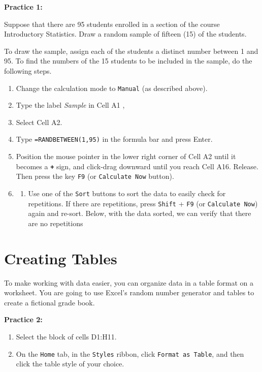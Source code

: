 \documentclass[
]{book}
\providecommand{\tightlist}{%
  \setlength{\itemsep}{0pt}\setlength{\parskip}{0pt}}
\begin{document}
\textbf{Practice 1:}

Suppose that there are 95 students enrolled in a section of the course Introductory Statistics. Draw a random sample of fifteen (15) of the students.

To draw the sample, assign each of the students a distinct number between 1 and 95. To find the numbers of the 15 students to be included in the sample, do the following steps.

\begin{enumerate}
\def\labelenumi{\arabic{enumi}.}
\item
  Change the calculation mode to \texttt{Manual} (as described above).
\item
  Type the label \emph{Sample} in Cell A1 ,
\item
  Select Cell A2.
\item
  Type \texttt{=RANDBETWEEN(1,95)} in the formula bar and press Enter.
\item
  Position the mouse pointer in the lower right corner of Cell A2 until it becomes a \textbf{\texttt{+}} sign, and click-drag downward until you reach Cell A16. Release. Then press the key \texttt{F9} (or \texttt{Calculate\ Now} button).
\item
  \begin{enumerate}
  \def\labelenumii{\arabic{enumii})}
  \setcounter{enumii}{5}
  \tightlist
  \item
    Use one of the \texttt{Sort} buttons to sort the data to easily check for repetitions. If there are repetitions, press \texttt{Shift} + \texttt{F9} (or \texttt{Calculate\ Now}) again and re-sort. Below, with the data sorted, we can verify that there are no repetitions
  \end{enumerate}
\end{enumerate}

\hypertarget{creating-tables}{%
\section{Creating Tables}\label{creating-tables}}

To make working with data easier, you can organize data in a table format on a worksheet.
You are going to use Excel's random number generator and tables to create a fictional grade book.

\textbf{Practice 2:}

\begin{enumerate}
\def\labelenumi{\arabic{enumi}.}
\tightlist
\item
  Select the block of cells D1:H11.
\item
  On the \texttt{Home} tab, in the \texttt{Styles} ribbon, click \texttt{Format\ as\ Table}, and then click the table style of your choice.
\end{enumerate}
\end{document}
